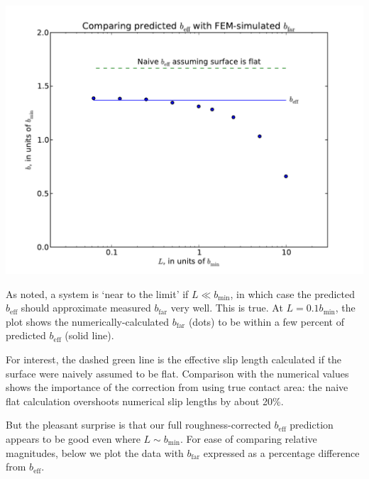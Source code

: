 \documentclass[a4paper]{report}
\newcommand{\beff}{\ensuremath{b_{\mathrm{eff}}}}
\newcommand{\bmin}{\ensuremath{b_{\mathrm{min}}}}
\newcommand{\bfar}{\ensuremath{b_{\mathrm{far}}}}
\begin{document}
\begin{center}
\includegraphics[scale=0.595]{Lund_Thesis_FEM_plot}
\end{center}


As noted, a system is `near to the limit' if $L \ll \bmin$, in which case the predicted $\beff$ should approximate measured $\bfar$ very well.  This is true.  At $L = 0.1 \bmin$, the plot shows the numerically-calculated $\bfar$ (dots) to be within a few percent of predicted $\beff$ (solid line).

For interest,
the dashed green line is the effective slip length calculated if the surface were naively assumed to be flat.  Comparison with the numerical values shows the importance of the correction from using true contact area: the naive flat calculation overshoots numerical slip lengths by about 20\%.



But the pleasant surprise is that our full roughness-corrected $\beff$ prediction appears to be good even where $L \sim \bmin$.
For ease of comparing relative magnitudes, below we plot the data with $\bfar$ expressed as a percentage difference from $\beff$.
\end{document}

